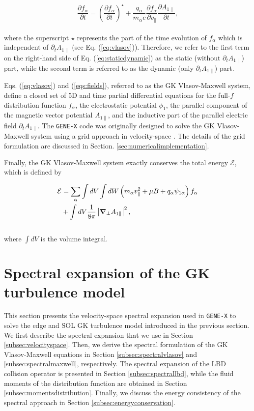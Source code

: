\documentclass[preprint,12pt]{elsarticle}
\begin{document}
\begin{equation} \label{eq:staticdynamic}
\frac{\partial f_\alpha}{\partial t}=\left(\frac{\partial f_\alpha}{\partial t}\right)^{\star}+\frac{q_\alpha}{m_\alpha c} \frac{\partial f_\alpha}{\partial v_{\|}} \frac{\partial A_{1 \parallel} }{\partial t},
\end{equation}
\\
where the superscript $\star$ represents the part of the time evolution of $f_\alpha$ which is independent of $\partial_t A_{1 \parallel}$ (see Eq. (\ref{eq:vlasov})). Therefore, we refer to the first term on the right-hand side of Eq. (\ref{eq:staticdynamic}) as the static (without $\partial_t A_{1 \parallel}$) part, while the second term is referred to as the dynamic (only $\partial_t A_{1 \parallel}$) part.

Eqs. (\ref{eq:vlasov}) and (\ref{eqs:fields}), referred to as the GK Vlasov-Maxwell system, define a closed set of $5$D and time partial differential equations for the full-$f$ distribution function $f_\alpha$, the electrostatic potential $\phi_1$, the parallel component of the magnetic vector potential $A_{1 \parallel}$, and the inductive part of the parallel electric field $ \partial_t A_{1 \parallel}$. The \verb|GENE-X| code was originally designed to solve the GK Vlasov-Maxwell system using a grid approach in velocity-space \cite{michels2021}. The details of the grid formulation are discussed in Section. \ref{sec:numericalimplementation}.

Finally, the GK Vlasov-Maxwell system exactly conserves the total energy $\mathcal{E}$, which is defined by \cite{scott2021}

\begin{align} \label{eq:totalenergy}
\mathcal{E} & = \sum_\alpha \int d V \int d W \left( m_\alpha v_{\|}^2+\mu B+ q_\alpha \psi_{1 \alpha} \right) f_\alpha \nonumber \\
& + \int d V \frac{1}{8 \pi}\left|\grad_{\perp} A_{1 \|}\right|^2,
\end{align}
\\
where $\int d V$ is the volume integral. 

\section{Spectral expansion of the GK turbulence model}
\label{sec:spectralgenex}

This section presents the velocity-space spectral expansion used in \verb|GENE-X| to solve the edge and SOL GK turbulence model introduced in the previous section. We first describe the spectral expansion that we use in Section \ref{subsec:velocityspace}. Then, we derive the spectral formulation of the GK Vlasov-Maxwell equations in Section \ref{subsec:spectralvlasov} and \ref{subsec:spectralmaxwell}, respectively. The spectral expansion of the LBD collision operator is presented in Section \ref{subsec:spectrallbd}, while the fluid moments of the distribution function are obtained in Section \ref{subsec:momentsdistribution}. Finally, we discuss the energy consistency of the spectral approach in Section \ref{subsec:energyconservation}.
\end{document}

